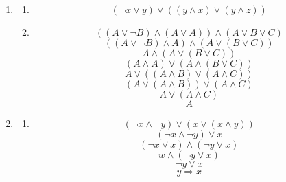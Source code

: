\documentclass[a4paper]{article}
\begin{document}
	\begin{enumerate}
		\item
		\begin{enumerate}
			\item
			\begin{equation*}
				(\lnot x \lor y) \lor ((y \land x) \lor (y \land z))
			\end{equation*}
			
			\item
			\begin{equation*}
				((A \lor \lnot B) \land (A \lor A)) \land (A \lor B \lor C)
			\end{equation*}
			\begin{equation*}
				((A \lor \lnot B) \land A) \land (A \lor (B \lor C))
			\end{equation*}
			\begin{equation*}
				A \land (A \lor (B \lor C))
			\end{equation*}
			\begin{equation*}
				(A \land A) \lor (A \land (B \lor C))
			\end{equation*}
			\begin{equation*}
				A \lor ((A \land B) \lor (A \land C))
			\end{equation*}
			\begin{equation*}
				(A \lor (A \land B)) \lor (A \land C)
			\end{equation*}
			\begin{equation*}
				A \lor (A \land C)
			\end{equation*}
			\begin{equation*}
				A
			\end{equation*}
		\end{enumerate}
		
		\item
		\begin{enumerate}
			\item
			\begin{equation*}
				(\lnot x \land \lnot y) \lor (x \lor (x \land y))
			\end{equation*}
			\begin{equation*}
				(\lnot x \land \lnot y) \lor x
			\end{equation*}
			\begin{equation*}
				(\lnot x \lor x) \land (\lnot y \lor x)
			\end{equation*}
			\begin{equation*}
				w \land (\lnot y \lor x)
			\end{equation*}
			\begin{equation*}
				\lnot y \lor x
			\end{equation*}
			\begin{equation*}
				y \Rightarrow x
			\end{equation*}
			

\end{enumerate}
\end{enumerate}
\end{document}
